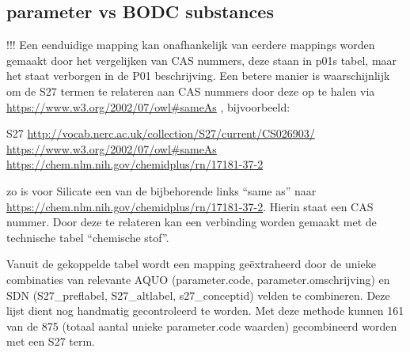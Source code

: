 \documentclass[
]{book}
\begin{document}
\hypertarget{parameter-vs-bodc-substances}{%
\subsection{parameter vs BODC substances}\label{parameter-vs-bodc-substances}}

!!! Een eenduidige mapping kan onafhankelijk van eerdere mappings worden gemaakt door het vergelijken van CAS nummers, deze staan in p01s tabel, maar het staat verborgen in de P01 beschrijving. Een betere manier is waarschijnlijk om de S27 termen te relateren aan CAS nummers door deze op te halen via \url{https://www.w3.org/2002/07/owl\#sameAs} , bijvoorbeeld:

S27 \url{http://vocab.nerc.ac.uk/collection/S27/current/CS026903/}
\url{https://www.w3.org/2002/07/owl\#sameAs}
\url{https://chem.nlm.nih.gov/chemidplus/rn/17181-37-2}

zo is voor Silicate een van de bijbehorende links ``same as'' naar \url{https://chem.nlm.nih.gov/chemidplus/rn/17181-37-2}. Hierin staat een CAS nummer. Door deze te relateren kan een verbinding worden gemaakt met de technische tabel ``chemische stof''.

Vanuit de gekoppelde tabel wordt een mapping geëxtraheerd door de unieke combinaties van relevante AQUO (parameter.code, parameter.omschrijving) en SDN (S27\_preflabel, S27\_altlabel, s27\_conceptid) velden te combineren. Deze lijst dient nog handmatig gecontroleerd te worden. Met deze methode kunnen 161 van de 875 (totaal aantal unieke parameter.code waarden) gecombineerd worden met een S27 term.
\end{document}
